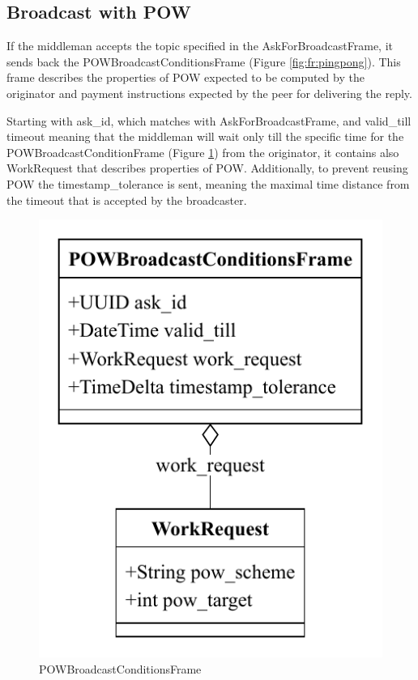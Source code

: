 \documentclass{article}
\begin{document}
\subsection{Broadcast with POW} 

If the middleman accepts the topic specified in the AskForBroadcastFrame, it sends back the POWBroadcastConditionsFrame (Figure \ref{fig:fr:pingpong}). This frame describes the properties of POW expected to be computed by the originator and payment instructions expected by the peer for delivering the reply.

Starting with ask\_id, which matches with AskForBroadcastFrame, and valid\_till timeout meaning that the middleman will wait only till the specific time for the POWBroadcastConditionFrame (Figure \ref{fig:fr:powbroadcastcondition}) from the originator, it contains also WorkRequest that describes properties of POW. Additionally, to prevent reusing POW the timestamp\_tolerance is sent, meaning the maximal time distance from the timeout that is accepted by the broadcaster.

\begin{figure}
	\centering
	\includegraphics[scale=0.7]{POWBroadcastCondition.pdf}
	\caption{POWBroadcastConditionsFrame}
	\label{fig:fr:powbroadcastcondition}
\end{figure}
\end{document}
